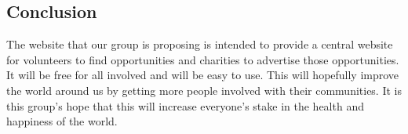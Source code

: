 \documentclass[12pt]{article}
\begin{document}
\subsection{Conclusion}
The website that our group is proposing is intended to provide a central website for volunteers to find opportunities and charities to advertise those opportunities.  It will be free for all involved and will be easy to use.  This will hopefully improve the world around us by getting more people involved with their communities. It is this group’s hope that this will increase everyone’s stake in the health and happiness of the world.  





\end{document}
